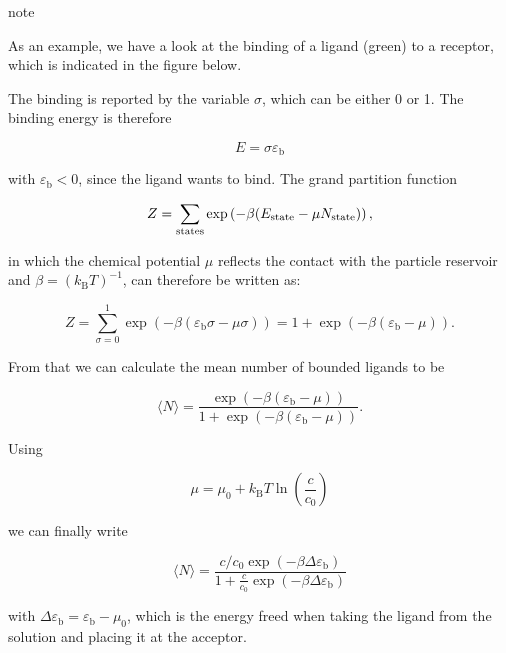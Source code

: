 \documentclass[letterpaper,10pt,english]{sphinxmanual}
\let\sphinxpxdimen\pdfpxdimen\else\newdimen\sphinxpxdimen
\begin{document}
\begin{sphinxadmonition}{note}{}\unskip
\sphinxAtStartPar
{}

\sphinxAtStartPar
As an example, we have a look at the binding of a ligand (green) to a receptor, which is indicated in the figure below.

\noindent\sphinxincludegraphics[width=400\sphinxpxdimen,height=144\sphinxpxdimen]{{two_state_binding}.png}

\sphinxAtStartPar
The binding is reported by the variable \(\sigma\), which can be either 0 or 1. The binding energy is therefore

\sphinxAtStartPar
\begin{equation}
E=\sigma \varepsilon_\mathrm{b}
\end{equation}

\sphinxAtStartPar
with \(\varepsilon_\mathrm{b}<0\), since the ligand wants to bind. The grand partition function

\sphinxAtStartPar
\begin{equation}
Z=\sum_{\rm states}\exp\left ( -\beta (E_{\rm state}- \mu N_{\rm state}) \right ),
\end{equation}

\sphinxAtStartPar
in which the chemical potential \(\mu\) reflects the contact with the particle reservoir and \(\beta=(k_\mathrm{B}T)^{-1}\), can therefore be written as:

\sphinxAtStartPar
\begin{equation}
Z=\sum_{\sigma=0}^{1}\exp\left ( -\beta (\varepsilon_\mathrm{b} \sigma- \mu \sigma) \right )=1+\exp(-\beta (\varepsilon_\mathrm{b} -\mu )).
\end{equation}

\sphinxAtStartPar
From that we can calculate the mean number of bounded ligands to be

\sphinxAtStartPar
\begin{equation}
\langle N \rangle =\frac{\exp(-\beta (\varepsilon_\mathrm{b} -\mu ))}{1+\exp(-\beta (\varepsilon_\mathrm{b} -\mu ))}.
\end{equation}

\sphinxAtStartPar
Using

\sphinxAtStartPar
\begin{equation}
\mu = \mu_0 + k_\mathrm{B} T \ln \left ( \frac{c}{c_0}\right )
\end{equation}

\sphinxAtStartPar
we can finally write

\sphinxAtStartPar
\begin{equation}
\langle N \rangle =\frac{c/c_0 \exp(-\beta \Delta \varepsilon_\mathrm{b})}{1+\frac{c}{c_0}\exp(-\beta \Delta \varepsilon_\mathrm{b})}
\end{equation}

\sphinxAtStartPar
with \(\Delta \varepsilon_\mathrm{b}=\varepsilon_\mathrm{b}-\mu_0\), which is the energy freed when taking the ligand from the solution and placing it at the acceptor.
\end{sphinxadmonition}
\end{document}

